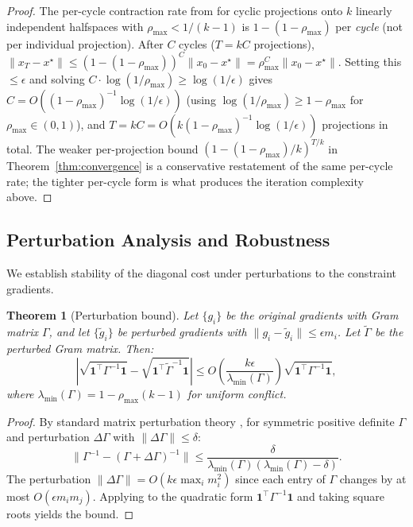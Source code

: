 \documentclass{article}
\theoremstyle{plain}
\newtheorem{theorem}{Theorem}[section]
\theoremstyle{definition}
\theoremstyle{remark}
\begin{document}
\begin{proof}
The per-cycle contraction rate from \citet[Thm.~4.1]{bauschke1996projection} for cyclic projections onto $k$ linearly independent halfspaces with $\rho_{\max} < 1/(k{-}1)$ is $1 - (1-\rho_{\max})$ per \emph{cycle} (not per individual projection). After $C$ cycles ($T = kC$ projections), $\|x_T - x^\star\| \le (1 - (1-\rho_{\max}))^{C} \|x_0 - x^\star\| = \rho_{\max}^{C} \|x_0 - x^\star\|$. Setting this $\le \epsilon$ and solving $C \cdot \log(1/\rho_{\max}) \ge \log(1/\epsilon)$ gives $C = O((1-\rho_{\max})^{-1} \log(1/\epsilon))$ (using $\log(1/\rho_{\max}) \ge 1-\rho_{\max}$ for $\rho_{\max} \in (0,1)$), and $T = kC = O(k(1-\rho_{\max})^{-1} \log(1/\epsilon))$ projections in total. The weaker per-projection bound $(1-(1-\rho_{\max})/k)^{T/k}$ in Theorem~\ref{thm:convergence} is a conservative restatement of the same per-cycle rate; the tighter per-cycle form is what produces the iteration complexity above.
\end{proof}

\subsection{Perturbation Analysis and Robustness}\label{app:perturbation}

We establish stability of the diagonal cost under perturbations to the constraint gradients.

\begin{theorem}[Perturbation bound]\label{thm:perturbation}
Let $\{g_i\}$ be the original gradients with Gram matrix $\Gamma$, and let $\{\tilde{g}_i\}$ be perturbed gradients with $\|g_i - \tilde{g}_i\| \le \epsilon m_i$. Let $\tilde{\Gamma}$ be the perturbed Gram matrix. Then:
\[
\left| \sqrt{\mathbf{1}^\top \Gamma^{-1} \mathbf{1}} - \sqrt{\mathbf{1}^\top \tilde{\Gamma}^{-1} \mathbf{1}} \right| \le O\left(\frac{k\epsilon}{\lambda_{\min}(\Gamma)}\right) \sqrt{\mathbf{1}^\top \Gamma^{-1} \mathbf{1}},
\]
where $\lambda_{\min}(\Gamma) = 1 - \rho_{\max}(k-1)$ for uniform conflict.
\end{theorem}

\begin{proof}
By standard matrix perturbation theory \citep[Thm.~2.8]{hornjohnson2013matrix}, for symmetric positive definite $\Gamma$ and perturbation $\Delta\Gamma$ with $\|\Delta\Gamma\| \le \delta$:
\[
\|\Gamma^{-1} - (\Gamma + \Delta\Gamma)^{-1}\| \le \frac{\delta}{\lambda_{\min}(\Gamma)(\lambda_{\min}(\Gamma) - \delta)}.
\]
The perturbation $\|\Delta\Gamma\| = O(k\epsilon \max_i m_i^2)$ since each entry of $\Gamma$ changes by at most $O(\epsilon m_i m_j)$. Applying to the quadratic form $\mathbf{1}^\top \Gamma^{-1} \mathbf{1}$ and taking square roots yields the bound.
\end{proof}
\end{document}
